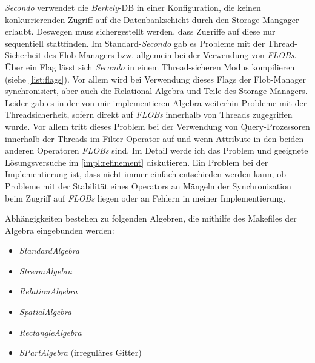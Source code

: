 \documentclass[a4paper,12pt,twoside]{article}
\newcommand{\Fb}[1]{\textit{#1}} %
\begin{document}
\Fb{Secondo} verwendet die \Fb{Berkely}-DB in einer Konfiguration, die keinen konkurrierenden Zugriff auf die Datenbankschicht durch den Storage-Mangager erlaubt. Deswegen muss sichergestellt werden, dass Zugriffe auf diese nur sequentiell stattfinden. Im Standard-\Fb{Secondo} gab es Probleme mit der Thread-Sicherheit des Flob-Managers bzw. allgemein bei der Verwendung von \Fb{FLOBs}. Über ein Flag lässt sich \Fb{Secondo} in einem Thread-sicheren Modus kompilieren (siehe \autoref{list:flags}). Vor allem wird bei Verwendung dieses Flags der Flob-Manager synchronisiert, aber auch die Relational-Algebra und Teile des Storage-Managers. Leider gab es in der von mir implementieren Algebra weiterhin Probleme mit der Threadsicherheit, sofern direkt auf \Fb{FLOBs} innerhalb von Threads zugegriffen wurde. Vor allem tritt dieses Problem bei der Verwendung von Query-Prozessoren innerhalb der Threads im Filter-Operator auf und wenn Attribute in den beiden anderen Operatoren \Fb{FLOBs} sind. Im Detail werde ich das Problem und geeignete Lösungsversuche im \autoref{impl:refinement} diskutieren. Ein Problem bei der Implementierung ist, dass nicht immer einfach entschieden werden kann, ob Probleme mit der Stabilität eines Operators an Mängeln der Synchronisation beim Zugriff auf \Fb{FLOBs} liegen oder an Fehlern in meiner Implementierung.

Abhängigkeiten bestehen zu folgenden Algebren, die mithilfe des Makefiles der Algebra eingebunden werden:

\begin{itemize}
	\item \Fb{StandardAlgebra}
	\item \Fb{StreamAlgebra}
	\item \Fb{RelationAlgebra}
	\item \Fb{SpatialAlgebra}
	\item \Fb{RectangleAlgebra}
	\item \Fb{SPartAlgebra} (irreguläres Gitter)
\end{itemize}
\end{document}
